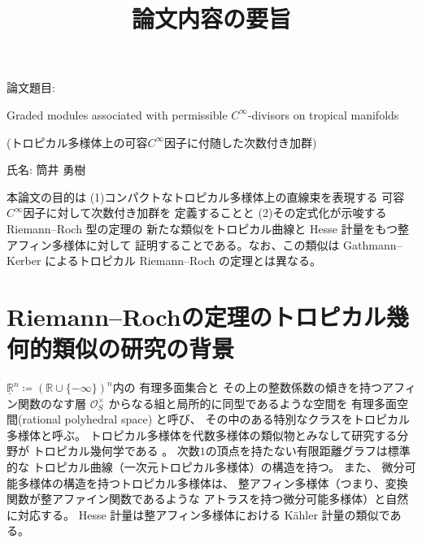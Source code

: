 \documentclass[uplatex,dvipdfmx,12pt]{jsarticle}
\title{論文内容の要旨
}
\date{}
\numberwithin{equation}{section}
\theoremstyle{definition}
\newcommand{\deq}{\coloneqq}
\newcommand{\beforesection}{\vspace{-15pt}}
\newcommand{\aftersection}{\vspace{-8pt}}
\begin{document}
\setlength{\baselineskip}{-5pt}
\setlength{\parskip}{2pt}


\maketitle
{\large
\noindent
論文題目:

Graded modules associated 
with permissible $C^{\infty}$-divisors on tropical manifolds

(トロピカル多様体上の可容$C^{\infty}$因子に付随した次数付き加群)
}

\vspace{5pt}

\noindent
{\large
氏名: 筒井 勇樹
}

\vspace{10pt}

\setlength{\baselineskip}{4pt}
\setlength{\parskip}{3pt}

本論文の目的は
(1)コンパクトなトロピカル多様体上の直線束を表現する
可容$C^{\infty}$因子に対して次数付き加群を
定義することと
(2)その定式化が示唆する Riemann--Roch 型の定理の
新たな類似をトロピカル曲線と Hesse 計量をもつ整アフィン多様体に対して
証明することである。なお、この類似は Gathmann--Kerber
によるトロピカル Riemann--Roch の定理とは異なる。

\beforesection

\section{Riemann--Rochの定理のトロピカル幾何的類似の研究の背景}

\aftersection

$\underline{\mathbb{R}}^{n} \deq (\mathbb{R}\cup\{-\infty\})^{n}$内の
有理多面集合と
その上の整数係数の傾きを持つアフィン関数のなす層 
$\mathcal{O}_S^{\times}$
からなる組と局所的に同型であるような空間を
有理多面空間(rational polyhedral space)
と呼び、
その中のある特別なクラスをトロピカル多様体と呼ぶ。
トロピカル多様体を代数多様体の類似物とみなして研究する分野が
トロピカル幾何学である
\cite{mikhalkinTropicalEigenwaveIntermediate2014a,
gross2019sheaftheoretic}。
次数$1$の頂点を持たない有限距離グラフは標準的な
トロピカル曲線（一次元トロピカル多様体）の構造を持つ。
また、
微分可能多様体の構造を持つトロピカル多様体は、
整アフィン多様体（つまり、変換関数が整アファイン関数であるような
アトラスを持つ微分可能多様体）と自然に対応する。
Hesse 計量は整アフィン多様体における
K\"ahler 計量の類似である。
\end{document}
